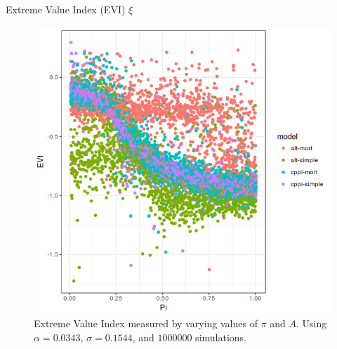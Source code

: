 \documentclass[10pt]{beamer}
\begin{document}
\begin{frame}[fragile]{Extreme Value Index (EVI) $\xi$}
  \begin{figure}[h]
    \centering
    \includegraphics[scale=0.45]{evi-pi_new.png}
    \caption{Extreme Value Index measured by varying values of $\pi$ and $A$.  Using $\alpha = 0.0343$, $\sigma = 0.1544$, and $1000000$ simulations.}
    \label{fig:evi-pi}
  \end{figure}
\end{frame}
\end{document}
